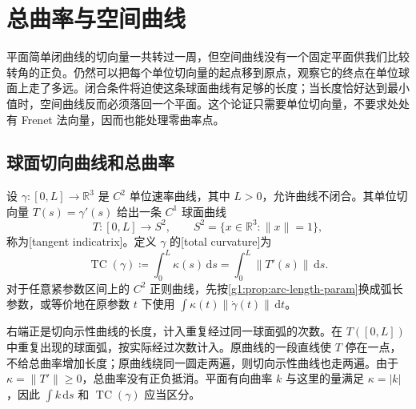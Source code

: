 
% 
% 
% 

\section{总曲率与空间曲线}
\label{g1:sec:0704}

平面简单闭曲线的切向量一共转过一周，但空间曲线没有一个固定平面供我们比较转角的正负。仍然可以把每个单位切向量的起点移到原点，观察它的终点在单位球面上走了多远。闭合条件将迫使这条球面曲线有足够的长度；当长度恰好达到最小值时，空间曲线反而必须落回一个平面。这个论证只需要单位切向量，不要求处处有 Frenet 法向量，因而也能处理零曲率点。

\subsection{球面切向曲线和总曲率}
\label{g1:subsec:0704:01}

\begin{definition}\label{g1:def:total-curvature}
	设 \(\gamma:[0,L]\to\mathbb R^3\) 是 \(C^2\) 单位速率曲线，其中 \(L>0\)，允许曲线不闭合。其单位切向量 \(T(s)=\gamma'(s)\) 给出一条 \(C^1\) 球面曲线
	\[
		T:[0,L]\longrightarrow S^2,\qquad
		S^2=\{x\in\mathbb R^3:\|x\|=1\},
	\]
	称为[tangent indicatrix]。定义 \(\gamma\) 的[total curvature]为
	\begin{equation}\label{g1:eq:total-curvature}
		\operatorname{TC}(\gamma)\coloneqq\int_0^L\kappa(s)\,\mathrm{d}s
		=\int_0^L\|T'(s)\|\,\mathrm{d}s.
	\end{equation}
	对于任意紧参数区间上的 \(C^2\) 正则曲线，先按\cref{g1:prop:arc-length-param}换成弧长参数，或等价地在原参数 \(t\) 下使用 \(\int\kappa(t)\|\dot\gamma(t)\|\,\mathrm{d}t\)。
\end{definition}

右端正是切向示性曲线的长度，计入重复经过同一球面弧的次数。在 \(T([0,L])\) 中重复出现的球面弧，按实际经过次数计入。原曲线的一段直线使 \(T\) 停在一点，不给总曲率增加长度；原曲线绕同一圆走两遍，则切向示性曲线也走两遍。由于 \(\kappa=\|T'\|\ge0\)，总曲率没有正负抵消。平面有向曲率 \(k\) 与这里的量满足 \(\kappa=|k|\)，因此 \(\int k\,\mathrm{d}s\) 和 \(\operatorname{TC}(\gamma)\) 应当区分。

